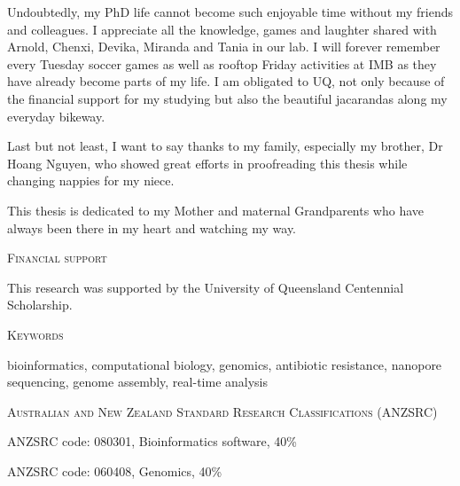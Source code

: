 \vspace{.3cm}

Undoubtedly, my PhD life cannot become such enjoyable time without my friends and colleagues. I appreciate all the knowledge, games and laughter shared with Arnold, Chenxi, Devika, Miranda and Tania in our lab. I will forever remember every Tuesday soccer games as well as rooftop Friday activities at IMB as they have already become parts of my life. I am obligated to UQ, not only because of the financial support for my studying but also the beautiful jacarandas along my everyday bikeway. 

\vspace{.3cm}

Last but not least, I want to say thanks to my family, especially my brother, Dr Hoang Nguyen, who showed great efforts in proofreading this thesis while changing nappies for my niece.

\vspace{.3cm}

This thesis is dedicated to my Mother and maternal Grandparents who have always been there in my heart and watching my way.  

\afterpage{\null\thispagestyle{empty}\newpage}
\newpage


\thispagestyle{plain}

\begin{center}
\Large \textsc{Financial support}
\end{center}

This research was supported by the University of Queensland Centennial Scholarship.

\vspace{2cm}
\begin{center}
\Large \textsc{Keywords}
\end{center}

bioinformatics, computational biology, genomics, antibiotic resistance, nanopore sequencing, genome assembly, real-time analysis

\vspace{2cm}
\begin{center}
\Large \textsc{Australian and New Zealand Standard Research Classifications (ANZSRC)}
\end{center}

ANZSRC code: 080301, Bioinformatics software, 40\%

ANZSRC code: 060408, Genomics, 40\%

